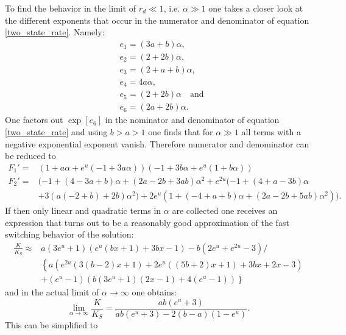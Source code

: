 To find the behavior in the limit of $r_d \ll 1 $, i.e. $\alpha \gg 1$ one takes a closer look at the different exponents that occur in the numerator and denominator of equation \eqref{two_state_rate}. Namely:
\begin{align}
& e_1 = (3a+b)\alpha, \nonumber \\
& e_2 = (2+2b)\alpha, \nonumber \\
& e_3 = (2+a+b)\alpha, \nonumber \\
& e_4 = 4a\alpha, \nonumber \\
& e_5 = (2+2b)\alpha \quad \textrm{and} \nonumber \\
& e_6 = (2a+2b)\alpha.
\end{align}
One factors out $\exp[e_6]$ in the nominator and denominator of equation \eqref{two_state_rate} and using $b > a > 1$ one finds that for $\alpha \gg 1$ all terms with a negative exponential exponent vanish. Therefore numerator and denominator can be reduced to
\begin{align*}
    F_1' =& ( 1 + a \alpha + e^u (-1 + 3 a \alpha)) (-1 + 3 b \alpha + e^u (1 + b \alpha))\\
    F_2' =& (-1 + (4 - 3 a + b) \alpha + (2 a - 2 b + 3 a b) \alpha^2 + e^{2 u} (-1 + (4 + a - 3 b) \alpha \\
          &+ 3 (a (-2 + b) + 2 b) \alpha^2) + 2 e^u (1 + (-4 + a + b) \alpha + (2 a - 2 b + 5 a b) \alpha^2)).
\end{align*}
If then only linear and quadratic terms in $\alpha$ are collected one receives an expression that turns out to be a reasonably good approximation of the fast switching behavior of the solution: 
\begin{align}
    \frac{K}{K_{S}} \approx &a \left(3 e^u+1\right) \left(e^u (b x+1)+3 b x-1\right)-b \left(2 e^u+e^{2 u}-3\right) / \nonumber \\
                          &\left\{a \left(e^{2 u} (3 (b-2) x+1)+2 e^u ((5 b+2) x+1)+3 b x+2 x-3\right) \right.  \nonumber \\
                          & \left. +\left(e^u-1\right) \left(b \left(3 e^u+1\right) (2 x-1)+4 \left(e^u-1\right)\right) \right\}
    \label{kla}
\end{align}
and in the actual limit of $\alpha \rightarrow \infty$ one obtains: 
\begin{equation}
    \lim_{\alpha \rightarrow \infty} \frac{K}{K_{S}} = \frac{a b \left(e^u+3\right)}{ab \left(e^u+3\right)-2(b-a)(1-e^u)}.
    \label{kliminfa}
\end{equation}
This can be simplified to 
